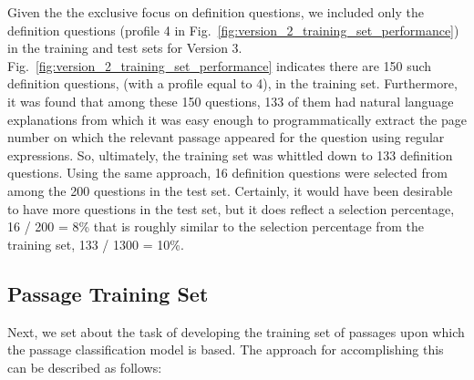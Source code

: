 
Given the the exclusive focus on definition questions, we included only the definition questions (profile 4 in Fig.~\ref{fig:version_2_training_set_performance}) in the training and test sets for Version 3. Fig.~\ref{fig:version_2_training_set_performance} indicates there are 150 such definition questions, (with a profile equal to 4), in the training set.  Furthermore, it was found that among these 150 questions, 133 of them had natural language explanations from which it was easy enough to programmatically extract the page number on which the relevant passage appeared for the question using regular expressions.  So, ultimately, the training set was whittled down to 133 definition questions.  Using the same approach, 16 definition questions were selected from among the 200 questions in the test set.  Certainly, it would have been desirable to have more questions in the test set, but it does reflect a selection percentage, 16 / 200 = 8\% that is roughly similar to the selection percentage from the training set, 133 / 1300 = 10\%.

\subsection{Passage Training Set}

Next, we set about the task of developing the training set of passages upon which the passage classification model is based.  The approach for accomplishing this can be described as follows:

